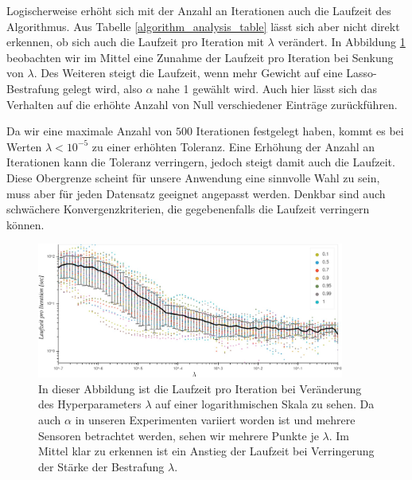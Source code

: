 Logischerweise erhöht sich mit der Anzahl an Iterationen auch die Laufzeit des Algorithmus. Aus Tabelle \ref{algorithm_analysis_table} lässt sich aber nicht direkt erkennen, ob sich auch die Laufzeit pro Iteration mit $\lambda$ verändert. In Abbildung \ref{run_time_per_iteration} beobachten wir im Mittel eine Zunahme der Laufzeit pro Iteration bei Senkung von $\lambda$. Des Weiteren steigt die Laufzeit, wenn mehr Gewicht auf eine Lasso-Bestrafung gelegt wird, also $\alpha$ nahe 1 gewählt wird. Auch hier lässt sich das Verhalten auf die erhöhte Anzahl von Null verschiedener Einträge zurückführen.

Da wir eine maximale Anzahl von $500$ Iterationen festgelegt haben, kommt es bei Werten $\lambda < 10^{-5}$ zu einer erhöhten Toleranz. Eine Erhöhung der Anzahl an Iterationen kann die Toleranz verringern, jedoch steigt damit auch die Laufzeit. Diese Obergrenze scheint für unsere Anwendung eine sinnvolle Wahl zu sein, muss aber für jeden Datensatz geeignet angepasst werden. Denkbar sind auch schwächere Konvergenzkriterien, die gegebenenfalls die Laufzeit verringern können.

\begin{figure}
\centering
\includegraphics[width = 0.9\textwidth]{figures/run_time_per_iteration.jpg}
\caption{In dieser Abbildung ist die Laufzeit pro Iteration bei Veränderung des Hyperparameters $\lambda$ auf einer logarithmischen Skala zu sehen. Da auch $\alpha$ in unseren Experimenten variiert worden ist und mehrere Sensoren betrachtet werden, sehen wir mehrere Punkte je $\lambda$. Im Mittel klar zu erkennen ist ein Anstieg der Laufzeit bei Verringerung der Stärke der Bestrafung $\lambda$.}
\label{run_time_per_iteration}
\end{figure}





